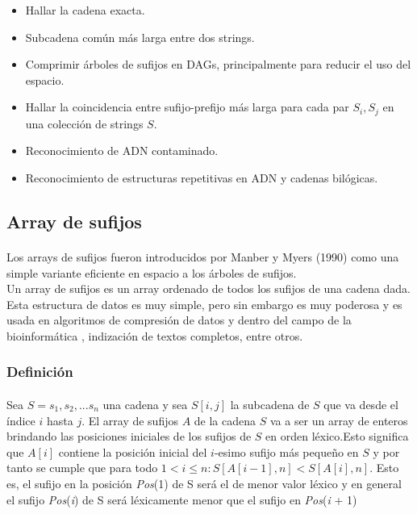\documentclass[es]{ifirak}
\begin{document}
\begin{itemize}
	\item Hallar la cadena exacta.
	\item Subcadena común más larga entre dos strings.
	\item Comprimir árboles de sufijos en DAGs, principalmente para reducir el uso del espacio.
	\item Hallar la coincidencia entre sufijo-prefijo más larga para cada par $S_{i},S_{j}$ en una colección de strings $S$.
	\item Reconocimiento de ADN contaminado.
	\item Reconocimiento de estructuras repetitivas en ADN y cadenas bilógicas.
\end{itemize}

\subsection{Array de sufijos}
\paragraph{}
Los arrays de sufijos fueron introducidos por Manber y Myers (1990) como una simple variante eficiente en espacio a los árboles de sufijos.\\

Un array de sufijos es un array ordenado de todos los sufijos de una cadena dada. Esta estructura de datos es muy simple, pero sin embargo es muy poderosa y es usada en algoritmos de compresión de datos y dentro del campo de la bioinformática , indización de textos completos, entre otros.

\subsubsection{Definición}
\paragraph{}
Sea $S=s_{1},s_{2},...s_{n}$ una cadena y sea $S[i,j]$ la subcadena de $S$ que va desde el índice $i$ hasta $j$.
El array de sufijos $A$ de la cadena $S$ va a ser un array de enteros brindando las posiciones iniciales de los sufijos de $S$ en orden léxico.Esto significa que $A[i]$ contiene la posición inicial del $i$-esimo sufijo más pequeño en $S$ y por tanto se cumple que para todo $1 < i\leq n: S[A[i-1],n] < S[A[i],n]$. Esto es, el sufijo en la posición \textit{Pos}(1) de S será el de menor valor léxico y en general el sufijo \textit{Pos}(\textit{i}) de S será léxicamente menor que el sufijo en \textit{Pos}(\textit{i} + 1) \\
\end{document}
